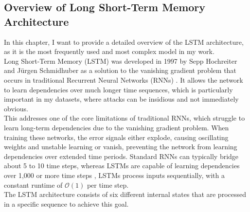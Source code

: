 \subsection{Overview of Long Short-Term Memory Architecture}
\label{subsec:lstm_overview}

In this chapter, I want to provide a detailed overview of the LSTM architecture, as it is the most frequently used and most complex model in my work.\\
Long Short-Term Memory (LSTM) was developed in 1997 by Sepp Hochreiter and Jürgen Schmidhuber as a solution to the vanishing gradient problem that occurs in traditional Recurrent Neural Networks (RNNs) \cite{LSTM_understanding}. It allows the network to learn dependencies over much longer time sequences, which is particularly important in my datasets, where attacks can be insidious and not immediately obvious.\\
This addresses one of the core limitations of traditional RNNs, which struggle to learn long-term dependencies due to the vanishing gradient problem. When training these networks, the error signals either explode, causing oscillating weights and unstable learning or vanish, preventing the network from learning dependencies over extended time periods. Standard RNNs can typically bridge about 5 to 10 time steps, whereas LSTMs are capable of learning dependencies over 1,000 or more time steps \cite{LSTM_understanding}, LSTMs process inputs sequentially, with a constant runtime of $\mathcal{O}(1)$ per time step.\\
The LSTM architecture consists of six different internal states that are processed in a specific sequence to achieve this goal.

